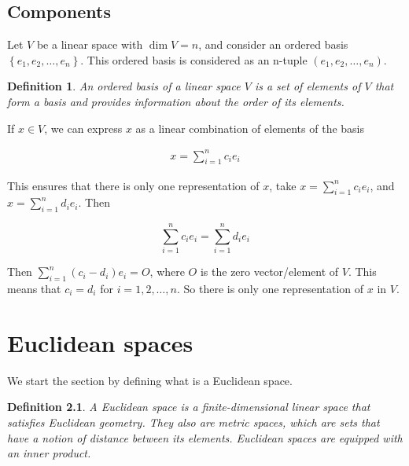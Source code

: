 \documentclass{book}
\newtheorem{definition}{Definition}[section]
\begin{document}
\section{Components}

Let $V$ be a linear space with $\dim V = n$, and consider an ordered basis
$\left\{e_1, e_2,\dots,e_n\right\}$. This ordered basis is considered as an
n-tuple $\left(e_1,e_2,\dots,e_n\right)$.

\begin{definition}
    An ordered basis of a linear space $V$ is a set of elements of $V$ that form a basis and provides information
    about the order of its elements.
\end{definition}

If $x\in V$, we can express $x$ as a linear combination of elements of the
basis

\begin{equation}
    \begin{split}
        x=\sum_{i=1}^{n}{c_i e_i}
    \end{split}
\end{equation}

This ensures that there is only one representation of $x$, take $x =
    \sum_{i=1}^{n}{c_i e_i}$, and $x = \sum_{i=1}^{n}{d_i e_i}$. Then

\[
    \sum_{i=1}^{n}{c_i e_i} = \sum_{i=1}^{n}{d_i e_i}
\]

Then $\sum_{i=1}^{n}{(c_i - d_i) e_i} = O$, where $O$ is the zero
vector/element of $V$. This means that $c_i=d_i$ for $i=1,2,\dots,n$. So there
is only one representation of $x$ in $V$.

\chapter{Euclidean spaces}

We start the section by defining what is a Euclidean space.

\begin{definition}
    A \textit{Euclidean space} is a finite-dimensional linear space that satisfies
    Euclidean geometry. They also are metric spaces, which are sets that have a notion
    of distance between its elements. Euclidean spaces are equipped with an \textit{inner product}.
\end{definition}
\end{document}
